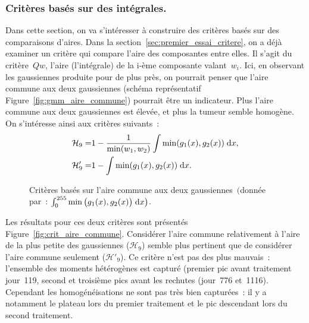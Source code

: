 \documentclass[main.tex]{subfiles}
\begin{document}
\subsubsection{Critères basés sur des intégrales.}
Dans cette section, on va s'intéresser à construire des critères basés sur des comparaisons  d'aires. Dans la section~\ref{sec:premier_essai_critere}, on a déjà examiner un critère qui compare l'aire des composantes entre elles. Il s'agit du critère~$Qw$, l'aire (l'intégrale) de la i-ème composante valant~$w_i$. 
Ici, en observant les gaussiennes produite pour \Nber de plus près, on pourrait penser que l'aire commune aux deux gaussiennes (\cf schéma représentatif Figure~\ref{fig:gmm_aire_commune}) pourrait être un indicateur. Plus l'aire commune aux deux gaussiennes est élevée, et plus la tumeur semble homogène.  On s'intéresse ainsi aux critères suivants~:
\begin{align}
\mathcal{H}_9 =& 1 - \dfrac{ 1 }{\min(w_1,w_2)}\int \min(g_1(x),g_2(x)) \;{\rm d}x, \\
\mathcal{H}'_9 =& 1-\int \min(g_1(x),g_2(x)) \;{\rm d}x.
\end{align}
\begin{figure}
\caption{Critères basés sur l'aire commune aux deux gaussiennes~$\big($donnée par~: $\int_0^{255} \min \big(g_1(x),g_2(x) \big) \;{\rm d}x \big)$.}
\end{figure}
Les résultats pour ces deux critères sont présentés  Figure~\ref{fig:crit_aire_commune}. 
Considérer l'aire commune relativement à l'aire de la plus petite des gaussiennes ($\mathcal{H}_9$) semble plus pertinent que de considérer l'aire commune seulement ($\mathcal{H}'_9$). Ce critère n'est pas des plus mauvais~: l'ensemble des moments hétérogènes est capturé (premier pic avant traitement jour~119, second et troisième pics avant les rechutes (jour~776 et~1116). Cependant les homogénéisations ne sont pas très bien capturées~: il y a notamment le plateau lors du premier traitement et le pic descendant lors du second traitement.
\end{document}
